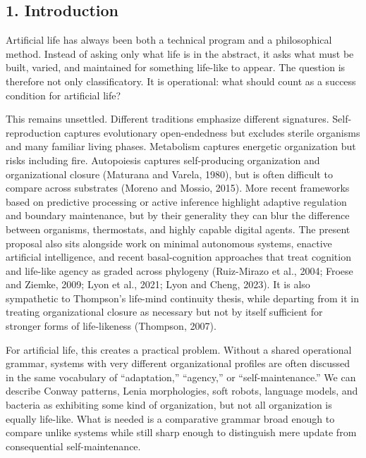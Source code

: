 \documentclass[Afour,sageh,times,doublespace]{sagej}
\begin{document}
\maketitle

\subsection{1. Introduction}\label{introduction}

Artificial life has always been both a technical program and a philosophical method. Instead of asking only what life is in the abstract, it asks what must be built, varied, and maintained for something life-like to appear. The question is therefore not only classificatory. It is operational: what should count as a success condition for artificial life?

This remains unsettled. Different traditions emphasize different signatures. Self-reproduction captures evolutionary open-endedness but excludes sterile organisms and many familiar living phases. Metabolism captures energetic organization but risks including fire. Autopoiesis captures self-producing organization and organizational closure (Maturana and Varela, 1980), but is often difficult to compare across substrates (Moreno and Mossio, 2015). More recent frameworks based on predictive processing or active inference highlight adaptive regulation and boundary maintenance, but by their generality they can blur the difference between organisms, thermostats, and highly capable digital agents. The present proposal also sits alongside work on minimal autonomous systems, enactive artificial intelligence, and recent basal-cognition approaches that treat cognition and life-like agency as graded across phylogeny (Ruiz-Mirazo et al., 2004; Froese and Ziemke, 2009; Lyon et al., 2021; Lyon and Cheng, 2023). It is also sympathetic to Thompson's life-mind continuity thesis, while departing from it in treating organizational closure as necessary but not by itself sufficient for stronger forms of life-likeness (Thompson, 2007).

For artificial life, this creates a practical problem. Without a shared operational grammar, systems with very different organizational profiles are often discussed in the same vocabulary of ``adaptation,'' ``agency,'' or ``self-maintenance.'' We can describe Conway patterns, Lenia morphologies, soft robots, language models, and bacteria as exhibiting some kind of organization, but not all organization is equally life-like. What is needed is a comparative grammar broad enough to compare unlike systems while still sharp enough to distinguish mere update from consequential self-maintenance.
\end{document}
